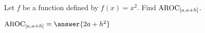 \documentclass{ximera}
\author{Kenneth Berglund}
\begin{document}
\licenseSZ
\begin{exercise}
Let $f$ be a function defined by $f(x) = x^2$. Find $\mathrm{AROC}_{[a, a+h]}$.

$\av_{[a, a+h]} = \answer{2a + h^2}$

\end{exercise}
\end{document}

